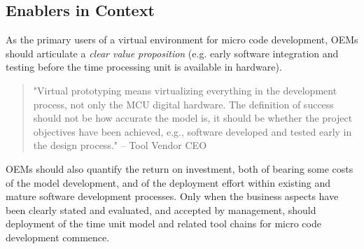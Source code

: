 

\subsection{Enablers in Context}


As the primary users of a virtual environment for micro code development, OEMs should articulate a \emph{clear value proposition} (e.g. early software integration and testing before the time processing unit is available in hardware).

\begin{quote}
"Virtual prototyping means virtualizing everything in the development process, not only the MCU digital hardware.
The definition of success should not be how accurate the model is, it should be whether the project objectives have been achieved, e.g., software developed and tested early in the design process."
-- Tool Vendor CEO
\end{quote}

OEMs should also quantify the return on investment, both of bearing some costs of the model development, and of the deployment effort within existing and mature software development processes.
Only when the business aspects have been clearly stated and evaluated, and accepted by management, should deployment of the time unit model and related tool chains for micro code development commence.



